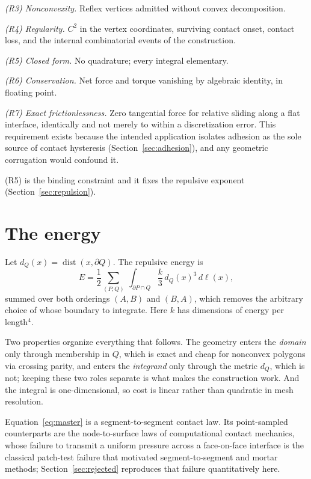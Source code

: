 \documentclass[11pt]{article}
\newcommand{\dist}{\operatorname{dist}}
\begin{document}
\emph{(R3) Nonconvexity.} Reflex vertices admitted without convex decomposition.

\emph{(R4) Regularity.} $C^2$ in the vertex coordinates, surviving contact onset, contact loss, and the internal combinatorial events of the construction.

\emph{(R5) Closed form.} No quadrature; every integral elementary.

\emph{(R6) Conservation.} Net force and torque vanishing by algebraic identity, in floating point.

\emph{(R7) Exact frictionlessness.} Zero tangential force for relative sliding along a flat interface, identically and not merely to within a discretization error. This requirement exists because the intended application isolates adhesion as the sole source of contact hysteresis (Section~\ref{sec:adhesion}), and any geometric corrugation would confound it.

(R5) is the binding constraint and it fixes the repulsive exponent (Section~\ref{sec:repulsion}).

\section{The energy}
\label{sec:energy}

Let $d_Q(x) = \dist(x,\partial Q)$. The repulsive energy is
\begin{equation}
\boxed{\;
E = \frac{1}{2}\sum_{(P,Q)}\ \int_{\partial P\cap Q} \frac{k}{3}\,d_Q(x)^3\,d\ell(x),
\;}
\label{eq:master}
\end{equation}
summed over both orderings $(A,B)$ and $(B,A)$, which removes the arbitrary choice of whose boundary to integrate. Here $k$ has dimensions of energy per length$^4$.

Two properties organize everything that follows. The geometry enters the \emph{domain} only through membership in $Q$, which is exact and cheap for nonconvex polygons via crossing parity, and enters the \emph{integrand} only through the metric $d_Q$, which is not; keeping these two roles separate is what makes the construction work. And the integral is one-dimensional, so cost is linear rather than quadratic in mesh resolution.

Equation~\eqref{eq:master} is a segment-to-segment contact law. Its point-sampled counterparts are the node-to-surface laws of computational contact mechanics, whose failure to transmit a uniform pressure across a face-on-face interface is the classical patch-test failure that motivated segment-to-segment and mortar methods; Section~\ref{sec:rejected} reproduces that failure quantitatively here.
\end{document}
